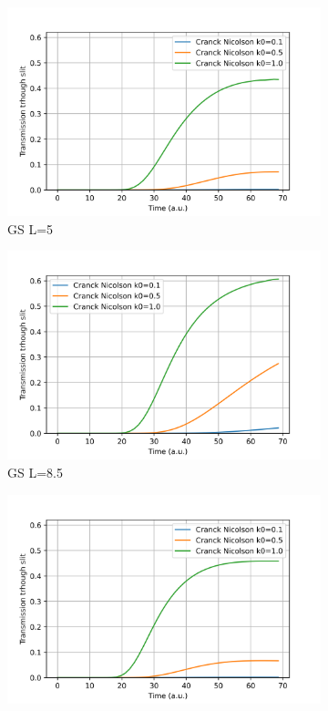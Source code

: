 \documentclass[11pt, a4paper]{article} %
\begin{document}
\begin{figure}[h!]
  \centering
  \begin{subfigure}[b]{0.5\linewidth}
    \includegraphics[width=\linewidth]{Transmission_GS_CN_L5.png}
    \caption{GS L=5}
  \end{subfigure}
  \begin{subfigure}[b]{0.49\linewidth}
    \includegraphics[width=\linewidth]{Transmission_GS_CN_L8.5.png}
    \caption{GS L=8.5}
  \end{subfigure}
    \begin{subfigure}[b]{0.49\linewidth}
    \includegraphics[width=\linewidth]{Transmission_GG_CN_L5.png}

\end{subfigure}
\end{figure}
\end{document}
